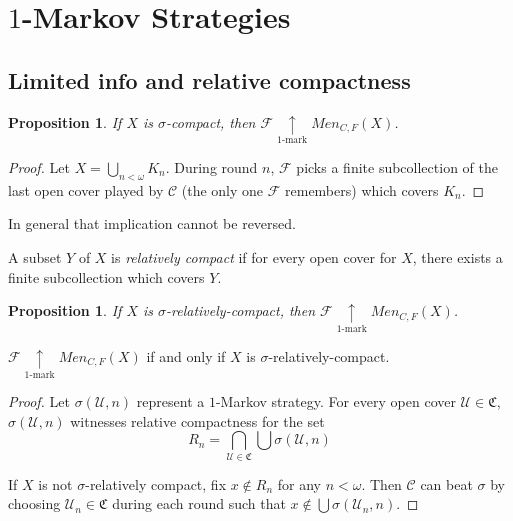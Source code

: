 \documentclass{beamer}
\newtheorem{proposition}[theorem]{Proposition}
\theoremstyle{definition}
\newcommand{\kmarkwin}[1]{\underset{#1\text{-mark}}{\uparrow}}
\newcommand{\mengame}[1]{Men_{C,F}(#1)}
\newcommand{\<}{\langle}
\renewcommand{\>}{\rangle}
\newcommand{\mc}[1]{\mathcal{#1}}
\newcommand{\pl}[1]{\mathscr{#1}}
\newcommand{\term}{\textit}
\begin{document}
\section{$1$-Markov Strategies}

\subsection{Limited info and relative compactness}

\begin{frame}
  \begin{proposition}
    If $X$ is $\sigma$-compact, then $\pl F \kmarkwin{1}\mengame X$.
  \end{proposition}

  \begin{proof}
    Let $X=\bigcup_{n<\omega}K_n$. During round $n$, $\pl F$ picks a finite
    subcollection of
    the last open cover played by $\pl C$ (the only one $\pl F$ remembers)
    which covers $K_n$.
  \end{proof}
\end{frame}

\begin{frame}
  In general that implication cannot be reversed.

  \pause

  \begin{definition}
    A subset $Y$ of $X$ is \term{relatively compact} if for every open cover
    for $X$, there exists a finite subcollection which covers $Y$.
  \end{definition}

  \begin{proposition}
    If $X$ is $\sigma$-relatively-compact, then $\pl F \kmarkwin{1}\mengame X$.
  \end{proposition}
\end{frame}

\begin{frame}

  \begin{theorem}
    $\pl F \kmarkwin{1}\mengame X$ if and only if $X$ is
    $\sigma$-relatively-compact.
  \end{theorem}

  \pause

  \begin{proof}
    Let $\sigma(\mc U, n)$ represent a $1$-Markov strategy.
    For every open cover $\mc U\in\mathfrak C$, $\sigma(\mc{U},n)$
    witnesses relative compactness for the set
      \[
        R_n
          =
        \bigcap_{\mc U\in\mathfrak C}\bigcup \sigma(\mc U,n)
      \]

    \pause

    If $X$ is not $\sigma$-relatively compact, fix $x \not\in R_n$ for any
    $n<\omega$. Then $\pl C$ can beat
    $\sigma$ by choosing $\mc{U}_n\in\mathfrak{C}$ during each round
    such that $x\not\in \bigcup\sigma(\mc{U}_n,n)$.
  \end{proof}
\end{frame}
\end{document}

